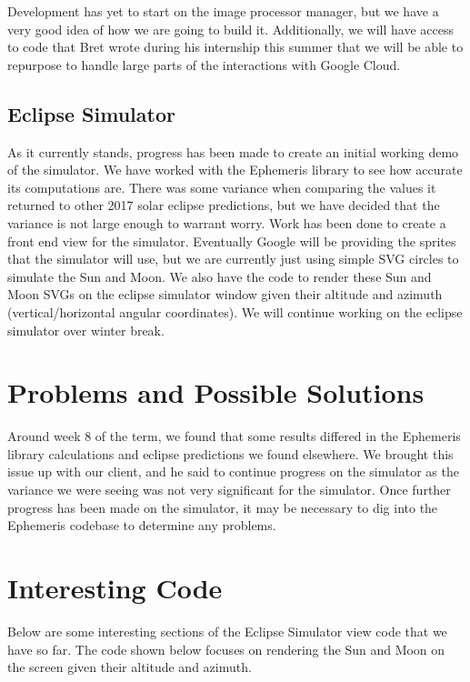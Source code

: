 \documentclass[10pt, onecolumn, draftclsnofoot, letterpaper, compsoc]{IEEEtran}
\begin{document}
Development has yet to start on the image processor manager, but we have a very good idea of how we
are going to build it. Additionally, we will have access to code that Bret wrote during his internship
this summer that we will be able to repurpose to handle large parts of the interactions with Google Cloud.

\subsection{Eclipse Simulator}

As it currently stands, progress has been made to create an initial working
demo of the simulator. We have worked with the Ephemeris library to see how
accurate its computations are. There was some variance when comparing the
values it returned to other 2017 solar eclipse predictions, but we have
decided that the variance is not large enough to warrant worry. Work has
been done to create a front end view for the simulator. Eventually Google
will be providing the sprites that the simulator will use, but we are currently
just using simple SVG circles to simulate the Sun and Moon. We also have the
code to render these Sun and Moon SVGs on the eclipse simulator window given
their altitude and azimuth (vertical/horizontal angular coordinates). We will
continue working on the eclipse simulator over winter break.

\section{Problems and Possible Solutions}

Around week 8 of the term, we found that some results differed in the Ephemeris
library calculations and eclipse predictions we found elsewhere. We brought
this issue up with our client, and he said to continue progress on the
simulator as the variance we were seeing was not very significant for the
simulator. Once further progress has been made on the simulator, it may be
necessary to dig into the Ephemeris codebase to determine any problems.

\section{Interesting Code}

Below are some interesting sections of the Eclipse Simulator view code that we have so far. 
The code shown below focuses on rendering the Sun and Moon on the screen given their
altitude and azimuth. \\
\end{document}
